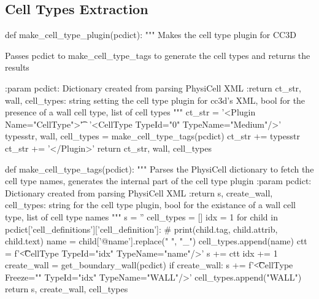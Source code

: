 \subsection{Cell Types Extraction}\label{appendix:trans:cell-types-conv:types}
\begin{python}
def make_cell_type_plugin(pcdict):
    """
    Makes the cell type plugin for CC3D

    Passes pcdict to make_cell_type_tags to generate the cell types and returns the results

    :param pcdict: Dictionary created from parsing PhysiCell XML
    :return ct_str, wall, cell_types: string setting the cell type plugin for cc3d's XML, bool for the presence of a
    wall cell type, list of cell types
    """
    ct_str = '\n<Plugin Name="CellType">\n\t' \
             '<CellType TypeId="0" TypeName="Medium"/>\n'
    typesstr, wall, cell_types = make_cell_type_tags(pcdict)
    ct_str += typesstr
    ct_str += '</Plugin>'
    return ct_str, wall, cell_types
\end{python}
\begin{python}
def make_cell_type_tags(pcdict):
    """
    Parses the PhysiCell dictionary to fetch the cell type names, generates the internal part of the cell type plugin
    :param pcdict: Dictionary created from parsing PhysiCell XML
    :return s, create_wall, cell_types: string for the cell type plugin, bool for the existance of a wall cell type,
    list of cell type names
    """
    s = ''
    cell_types = []
    idx = 1
    for child in pcdict['cell_definitions']['cell_definition']:
        # print(child.tag, child.attrib, child.text)
        name = child['@name'].replace(" ", "_")
        cell_types.append(name)
        ctt = f'\t<CellType TypeId="{idx}" TypeName="{name}"/>\n'
        s += ctt
        idx += 1
    create_wall = get_boundary_wall(pcdict)
    if create_wall:
        s += f'\t<CellType Freeze="" TypeId="{idx}" TypeName="WALL"/>\n'
        cell_types.append("WALL")
    return s, create_wall, cell_types
\end{python}

